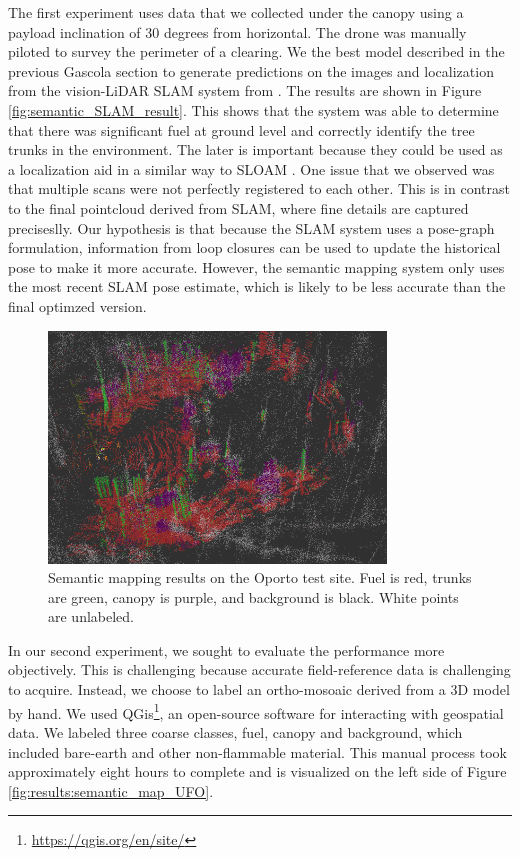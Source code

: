 The first experiment uses data that we collected under the canopy using a payload inclination of 30 degrees from horizontal. The drone was manually piloted to survey the perimeter of a clearing. We the best model described in the previous Gascola section to generate predictions on the images and localization from the vision-LiDAR SLAM system from \cite{RussellUnmannedMitigation}. The results are shown in Figure \ref{fig:semantic_SLAM_result}. This shows that the system was able to determine that there was significant fuel at ground level and correctly identify the tree trunks in the environment. The later is important because they could be used as a localization aid in a similar way to SLOAM \cite{Chen2020SLOAM:Inventory}. One issue that we observed was that multiple scans were not perfectly registered to each other. This is in contrast to the final pointcloud derived from SLAM, where fine details are captured preciseslly. Our hypothesis is that because the SLAM system uses a pose-graph \cite{Dellaert2017FactorPerception} formulation, information from loop closures can be used to update the historical pose to make it more accurate. However, the semantic mapping system only uses the most recent SLAM pose estimate, which is likely to be less accurate than the final optimzed version.

\begin{figure}
    \centering
    \includegraphics[width=0.8\textwidth]{figs/results/semantic_mapping/semantic_cloud_first_approach.png}
    \caption{Semantic mapping results on the Oporto test site. Fuel is red, trunks are green, canopy is purple, and background is black. White points are unlabeled.}
    \label{fig:results:semantic_mapping_original}
\end{figure}

In our second experiment, we sought to evaluate the performance more objectively. This is challenging because accurate field-reference data is challenging to acquire. Instead, we choose to label an ortho-mosoaic derived from a 3D model by hand. We used QGis\footnote{\url{https://qgis.org/en/site/}}, an open-source software for interacting with geospatial data. We labeled three coarse classes, fuel, canopy and background, which included bare-earth and other non-flammable material. This manual process took approximately eight hours to complete and is visualized on the left side of Figure \ref{fig:results:semantic_map_UFO}.

